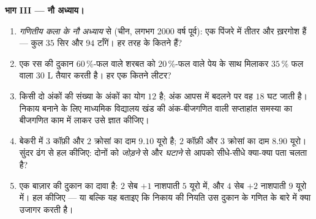 \begin{problem}
\medskip
\noindent\textbf{भाग III --- नौ अध्याय।}
\begin{enumerate}[resume]
  \item \emph{गणितीय कला के नौ अध्याय} से (चीन, लगभग 2000 वर्ष पूर्व): एक
        पिंजरे में तीतर और ख़रगोश हैं --- कुल $35$ सिर और $94$ टाँगें।
        हर तरह के कितने हैं?
  \item एक रस की दुकान $60\,\%$-फल वाले शरबत को $20\,\%$-फल वाले पेय के साथ
        मिलाकर $35\,\%$ फल वाला $30$ L तैयार करती है। हर एक कितने लीटर?
  \item किसी दो अंकों की संख्या के अंकों का योग $12$ है; अंक आपस में
        बदलने पर वह $18$ घट जाती है। निकाय बनाने के लिए माध्यमिक विद्यालय
        खंड की अंक-बीजगणित वाली सप्ताहांत समस्या का बीजगणित काम में लाकर
        उसे ज्ञात कीजिए।
  \item बेकरी में $3$ कॉफ़ी और $2$ क्रोसां का दाम $9.10$ यूरो है; $2$
        कॉफ़ी और $3$ क्रोसां का दाम $8.90$ यूरो। सुंदर ढंग से हल कीजिए:
        दोनों  को \emph{जोड़ने} से और \emph{घटाने} से आपको सीधे-सीधे
        क्या-क्या पता चलता है?
  \item एक बाज़ार की दुकान का दावा है: $2$ सेब $+ 1$ नाशपाती $5$ यूरो
        में, और $4$ सेब $+ 2$ नाशपाती $9$ यूरो में। हल कीजिए --- या
        बल्कि यह बताइए कि निकाय की नियति उस दुकान के गणित के बारे में क्या
        उजागर करती है।
\end{enumerate}


\end{problem}
